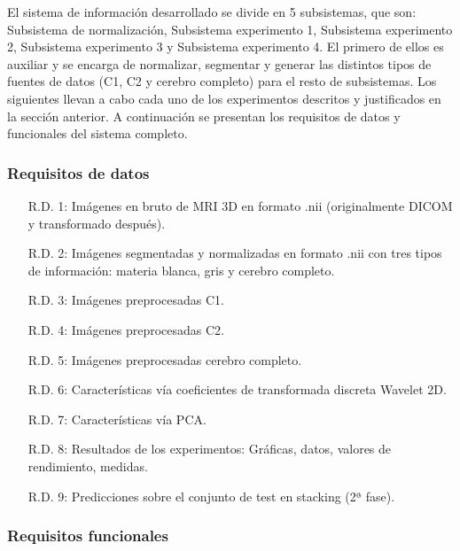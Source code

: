 El sistema de información desarrollado se divide en 5 subsistemas, que son: Subsistema de normalización, Subsistema experimento 1, Subsistema experimento 2, Subsistema experimento 3 y Subsistema experimento 4. El primero de ellos es auxiliar y se encarga de normalizar, segmentar y generar las distintos tipos de fuentes de datos (C1, C2 y cerebro completo) para el resto de subsistemas. Los siguientes llevan a cabo cada uno de los experimentos descritos y justificados en la sección anterior. A continuación se presentan los requisitos de datos y funcionales del sistema completo.

\subsubsection{Requisitos de datos}

\begin{itemize}
	\item[R.D. 1:] Imágenes en bruto de MRI 3D en formato .nii (originalmente DICOM y transformado después).
	\item[R.D. 2:] Imágenes segmentadas y normalizadas en formato .nii con tres tipos de información: materia blanca, gris y cerebro completo.
	\item[R.D. 3:] Imágenes preprocesadas C1.
	\item[R.D. 4:] Imágenes preprocesadas C2.
	\item[R.D. 5:] Imágenes preprocesadas cerebro completo.
	\item[R.D. 6:] Características vía coeficientes de transformada discreta Wavelet 2D.
	\item[R.D. 7:] Características vía PCA.
	\item[R.D. 8:] Resultados de los experimentos: Gráficas, datos, valores de rendimiento, medidas.
	\item[R.D. 9:] Predicciones sobre el conjunto de test en stacking (2ª fase).
\end{itemize}

\subsubsection{Requisitos funcionales}

